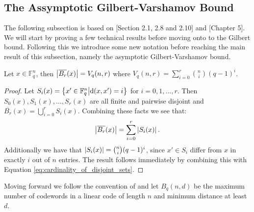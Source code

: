 \subsection{The Assymptotic Gilbert-Varshamov Bound}
The following subsection is based on \cite{huffman}[Section 2.1, 2.8 and 2.10] and \cite{notes_on_alg_geom_codes}[Chapter 5]. We will start by proving a few technical results before moving onto to the Gilbert bound. Following this we introduce some new notation before reaching the main result of this subsection, namely the asymptotic Gilbert-Varshamov bound.

\begin{lemma}\label{lem:number_of_elements_in_sphere}
  Let $x \in \mathbb{F}_q^n$, then $\left\lvert\overline{B_{r}}(x)\right\rvert = V_{q}(n, r)$ where $V_{q}(n, r) = \sum_{i=0}^r \binom{n}{i} (q - 1)^{i}$.
\end{lemma}
\begin{proof}
  Let $S_i(x) = \left\{x' \in \mathbb{F}_q^n \middle| \mathrm{d}(x, x') = i\right\}$ for $i = 0, 1, \ldots, r$. Then $S_0(x), S_1(x), \ldots, S_{r}(x)$ are all finite and pairwise disjoint and $\overline{B_r}(x) = \bigcup_{i = 0}^r S_i(x)$. Combining these facts we see that:
  \begin{equation}\label{eq:cardinality_of_disjoint_sets}
    \left\lvert\overline{B_r}(x)\right\rvert = \sum_{i = 0}^r \left\lvert S_i(x)\right\rvert.
  \end{equation}
  Additionally we have that $\left\lvert S_i(x)\right\rvert = \binom{n}{i}(q - 1)^i$, since $x' \in S_{i}$ differ from $x$ in exactly $i$ out of $n$ entries. The result follows immediately by combining this with Equation \eqref{eq:cardinality_of_disjoint_sets}.
\end{proof}

Moving forward we follow the convention of \cite{huffman} and let $B_q(n, d)$ be the maximum number of codewords in a linear code of length $n$ and minimum distance at least $d$.



